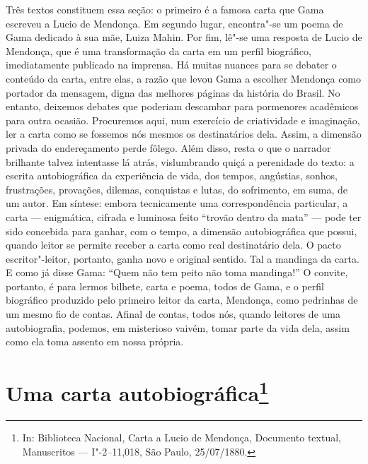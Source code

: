 \mbox{}\vfill
\thispagestyle{empty}
{\footnotesize\noindent
Três textos constituem essa seção: o primeiro é a famosa carta que Gama
escreveu a Lucio de Mendonça. Em segundo lugar, encontra"-se um poema de
Gama dedicado à sua mãe, Luiza Mahin. Por fim, lê"-se uma resposta de
Lucio de Mendonça, que é uma transformação da carta em um perfil
biográfico, imediatamente publicado na imprensa. Há muitas nuances para
se debater o conteúdo da carta, entre elas, a razão que levou Gama a
escolher Mendonça como portador da mensagem, digna das melhores páginas
da história do Brasil. No entanto, deixemos debates que poderiam
descambar para pormenores acadêmicos para outra ocasião. Procuremos
aqui, num exercício de criatividade e imaginação, ler a carta como se
fossemos nós mesmos os destinatários dela. Assim, a dimensão privada do
endereçamento perde fôlego. Além disso, resta o que o narrador brilhante
talvez intentasse lá atrás, vislumbrando quiçá a perenidade do texto: a
escrita autobiográfica da experiência de vida, dos tempos, angústias,
sonhos, frustrações, provações, dilemas, conquistas e lutas, do
sofrimento, em suma, de um autor. Em síntese: embora tecnicamente uma
correspondência particular, a carta --- enigmática, cifrada e luminosa
feito ``trovão dentro da mata'' --- pode ter sido concebida para ganhar,
com o tempo, a dimensão autobiográfica que possui, quando leitor se
permite receber a carta como real destinatário dela. O pacto
escritor"-leitor, portanto, ganha novo e original sentido. Tal a mandinga
da carta. E como já disse Gama: ``Quem não tem peito não toma mandinga!''
O convite, portanto, é para lermos bilhete, carta e poema, todos de
Gama, e o perfil biográfico produzido pelo primeiro leitor da carta,
Mendonça, como pedrinhas de um mesmo fio de contas. Afinal de contas,
todos nós, quando leitores de uma autobiografia, podemos, em misterioso
vaivém, tomar parte da vida dela, assim como ela toma assento em nossa
própria.}

\@openrighttrue\makeatother \endgroup

%
%
%
%
%
%
%


\chapter{Uma carta autobiográfica\footnote[*]{In: Biblioteca
  Nacional, Carta a Lucio de Mendonça, Documento textual, Manuscritos ---
  I"-2--11,018, São Paulo, 25/07/1880.}}

